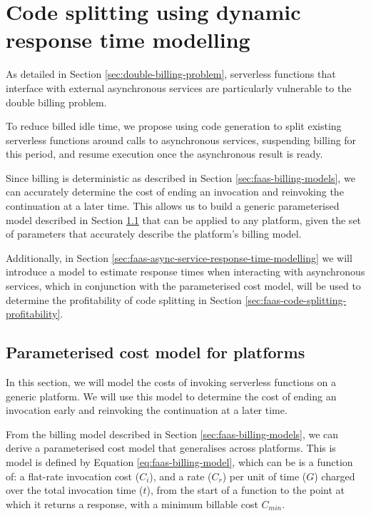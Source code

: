 \chapter{Code splitting using dynamic response time modelling}

As detailed in Section \ref{sec:double-billing-problem}, serverless functions that interface with external asynchronous services are particularly vulnerable to the double billing problem.

To reduce billed idle time, we propose using code generation to split existing serverless functions around calls to asynchronous services, suspending billing for this period, and resume execution once the asynchronous result is ready.

Since \faaas{} billing is deterministic as described in Section \ref{sec:faas-billing-models}, we can accurately determine the cost of ending an invocation and reinvoking the continuation at a later time. This allows us to build a generic parameterised model described in Section \ref{sec:faas-param-cost-model} that can be applied to any \faas{} platform, given the set of parameters that accurately describe the platform's billing model.

Additionally, in Section \ref{sec:faas-async-service-response-time-modelling} we will introduce a model to estimate response times when interacting with asynchronous services, which in conjunction with the parameterised cost model, will be used to determine the profitability of code splitting in Section \ref{sec:faas-code-splitting-profitability}.

\section{Parameterised cost model for \faas{} platforms}
\label{sec:faas-param-cost-model}

In this section, we will model the costs of invoking serverless functions on a generic \faas{} platform. We will use this model to determine the cost of ending an invocation early and reinvoking the continuation at a later time.

From the billing model described in Section \ref{sec:faas-billing-models}, we can derive a parameterised cost model that generalises across \faas{} platforms. This is model is defined by Equation \ref{eq:faas-billing-model}, which can be is  a function of: a flat-rate invocation cost ($C_i$), and a rate ($C_r$) per unit of time ($G$) charged over the total invocation time ($t$), from the start of a function to the point at which it returns a response, with a minimum billable cost $C_{min}$.

